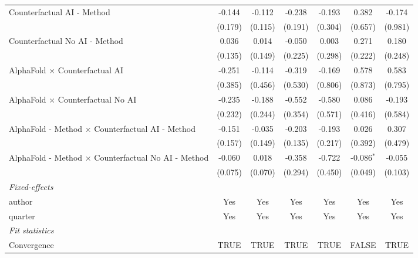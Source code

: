 \begin{tabular}{lcccccc}
   Counterfactual AI - Method                                 & -0.144  & -0.112  & -0.238  & -0.193  & 0.382        & -0.174\\   
                                                              & (0.179) & (0.115) & (0.191) & (0.304) & (0.657)      & (0.981)\\   
   Counterfactual No AI - Method                              & 0.036   & 0.014   & -0.050  & 0.003   & 0.271        & 0.180\\   
                                                              & (0.135) & (0.149) & (0.225) & (0.298) & (0.222)      & (0.248)\\   
   AlphaFold $\times$ Counterfactual AI                       & -0.251  & -0.114  & -0.319  & -0.169  & 0.578        & 0.583\\   
                                                              & (0.385) & (0.456) & (0.530) & (0.806) & (0.873)      & (0.795)\\   
   AlphaFold $\times$ Counterfactual No AI                    & -0.235  & -0.188  & -0.552  & -0.580  & 0.086        & -0.193\\   
                                                              & (0.232) & (0.244) & (0.354) & (0.571) & (0.416)      & (0.584)\\   
   AlphaFold - Method $\times$ Counterfactual AI - Method     & -0.151  & -0.035  & -0.203  & -0.193  & 0.026        & 0.307\\   
                                                              & (0.157) & (0.149) & (0.135) & (0.217) & (0.392)      & (0.479)\\   
   AlphaFold - Method $\times$ Counterfactual No AI - Method  & -0.060  & 0.018   & -0.358  & -0.722  & -0.086$^{*}$ & -0.055\\   
                                                              & (0.075) & (0.070) & (0.294) & (0.450) & (0.049)      & (0.103)\\   
   \midrule
   \emph{Fixed-effects}\\
   author                                                     & Yes     & Yes     & Yes     & Yes     & Yes          & Yes\\  
   quarter                                                    & Yes     & Yes     & Yes     & Yes     & Yes          & Yes\\  
   \midrule
   \emph{Fit statistics}\\
   Convergence                                                &TRUE     & TRUE    & TRUE    & TRUE    & FALSE        & TRUE\\  

\end{tabular}
